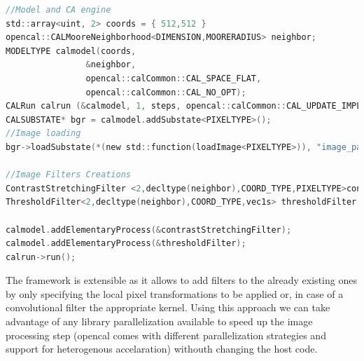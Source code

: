 \documentclass[conference]{IEEEtran}
\begin{document}
\begin{lstlisting}[language=C,caption=Example of usage of the Image processing XCA engine. A model and a CA runtime are created. The raw image is then read into the substate. Elementary processes corrensponding to the operations to be performed on the image are set and the runtime is launched. ,label=list:imgman]	
//Model and CA engine
std::array<uint, 2> coords = { 512,512 }
opencal::CALMooreNeighborhood<DIMENSION,MOORERADIUS> neighbor;
MODELTYPE calmodel(coords,
                &neighbor,
                opencal::calCommon::CAL_SPACE_FLAT,
                opencal::calCommon::CAL_NO_OPT);
CALRun calrun (&calmodel, 1, steps, opencal::calCommon::CAL_UPDATE_IMPLICIT); 
CALSUBSTATE* bgr = calmodel.addSubstate<PIXELTYPE>();
//Image loading
bgr->loadSubstate(*(new std::function(loadImage<PIXELTYPE>)), "image_path");

//Image Filters Creations
ContrastStretchingFilter <2,decltype(neighbor),COORD_TYPE,PIXELTYPE>contrastStretchingFilter(bgr, 1285, 1542, 0, 65535,1.0);
ThresholdFilter<2,decltype(neighbor),COORD_TYPE,vec1s> thresholdFilter (bgr,0,61680,0,65535);

calmodel.addElementaryProcess(&contrastStretchingFilter);
calmodel.addElementaryProcess(&thresholdFilter);
calrun->run();
\end{lstlisting}
The framework is extensible as it allows to add filters to the already existing ones by only specifying the local pixel transformations to be applied or, in case of a convolutional filter the appropriate kernel.
Using this approach we can take advantage of any library parallelization available to speed up the image processing step (opencal comes with different parallelization strategies and support for heterogenous accelaration) withouth changing the host code.
\end{document}
